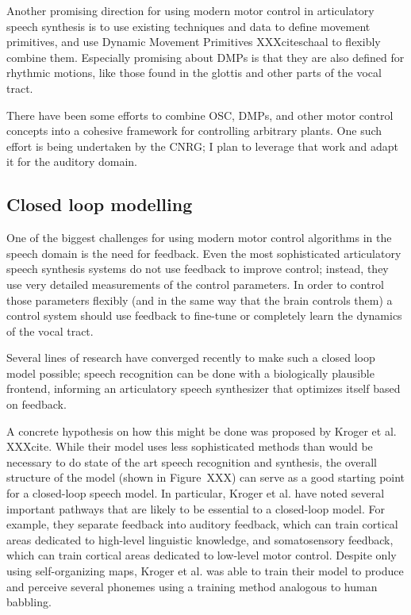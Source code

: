 \documentclass{article}
\begin{document}
Another promising direction
for using modern motor control
in articulatory speech synthesis
is to use existing techniques and data
to define movement primitives,
and use Dynamic Movement Primitives
XXXciteschaal to flexibly combine them.
Especially promising about DMPs
is that they are also defined
for rhythmic motions,
like those found in the glottis
and other parts of the vocal tract.

There have been some efforts
to combine OSC, DMPs, and other motor control concepts
into a cohesive framework
for controlling arbitrary plants.
One such effort is being undertaken
by the CNRG;
I plan to leverage that work and adapt
it for the auditory domain.

\subsection{Closed loop modelling}

One of the biggest challenges
for using modern motor control algorithms
in the speech domain
is the need for feedback.
Even the most sophisticated
articulatory speech synthesis systems
do not use feedback to improve control;
instead, they use very detailed measurements
of the control parameters.
In order to control those parameters flexibly
(and in the same way that the brain controls them)
a control system should use feedback
to fine-tune or completely learn
the dynamics of the vocal tract.

Several lines of research have converged recently
to make such a closed loop model possible;
speech recognition can be done
with a biologically plausible frontend,
informing an articulatory speech synthesizer
that optimizes itself based on feedback.

A concrete hypothesis on how
this might be done was proposed by Kroger et al.
XXXcite.
While their model uses less sophisticated
methods than would be necessary
to do state of the art speech
recognition and synthesis,
the overall structure of the model
(shown in Figure~XXX)
can serve as a good starting point
for a closed-loop speech model.
In particular, Kroger et al. have
noted several important pathways
that are likely to be essential
to a closed-loop model.
For example, they separate feedback
into auditory feedback,
which can train cortical areas
dedicated to high-level linguistic knowledge,
and somatosensory feedback,
which can train cortical areas
dedicated to low-level motor control.
Despite only using self-organizing maps,
Kroger et al. was able to train their model
to produce and perceive several phonemes
using a training method analogous
to human babbling.
\end{document}
